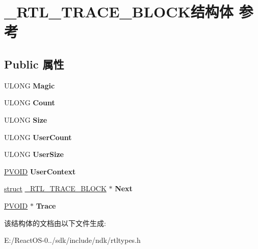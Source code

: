 \hypertarget{struct___r_t_l___t_r_a_c_e___b_l_o_c_k}{}\section{\+\_\+\+R\+T\+L\+\_\+\+T\+R\+A\+C\+E\+\_\+\+B\+L\+O\+C\+K结构体 参考}
\label{struct___r_t_l___t_r_a_c_e___b_l_o_c_k}
\subsection*{Public 属性}
\begin{DoxyCompactItemize}
\item 
\mbox{\label{struct___r_t_l___t_r_a_c_e___b_l_o_c_k_ae90b60c0f2a066729088cdd60474c30d}} 
U\+L\+O\+NG {\bfseries Magic}
\item 
\mbox{\label{struct___r_t_l___t_r_a_c_e___b_l_o_c_k_a5ec909c5648cd773cf4ccdcdfbf1ea66}} 
U\+L\+O\+NG {\bfseries Count}
\item 
\mbox{\label{struct___r_t_l___t_r_a_c_e___b_l_o_c_k_af17b0edf00ee002ff5e5aab5ca1ed260}} 
U\+L\+O\+NG {\bfseries Size}
\item 
\mbox{\label{struct___r_t_l___t_r_a_c_e___b_l_o_c_k_ad421ab182e3dbf3dcc73484c52e3e54c}} 
U\+L\+O\+NG {\bfseries User\+Count}
\item 
\mbox{\label{struct___r_t_l___t_r_a_c_e___b_l_o_c_k_a9b432a29a9535a60e6856be58e9c3a75}} 
U\+L\+O\+NG {\bfseries User\+Size}
\item 
\mbox{\label{struct___r_t_l___t_r_a_c_e___b_l_o_c_k_a0de03b5076c8ca529105cf23d7549c7f}} 
\hyperlink{interfacevoid}{P\+V\+O\+ID} {\bfseries User\+Context}
\item 
\mbox{\label{struct___r_t_l___t_r_a_c_e___b_l_o_c_k_a8b0c6d13c4581566169aca5d5577512e}} 
\hyperlink{interfacestruct}{struct} \hyperlink{struct___r_t_l___t_r_a_c_e___b_l_o_c_k}{\+\_\+\+R\+T\+L\+\_\+\+T\+R\+A\+C\+E\+\_\+\+B\+L\+O\+CK} $\ast$ {\bfseries Next}
\item 
\mbox{\label{struct___r_t_l___t_r_a_c_e___b_l_o_c_k_a1adf2aa95fbf56313495c1ec8ec1e825}} 
\hyperlink{interfacevoid}{P\+V\+O\+ID} $\ast$ {\bfseries Trace}
\end{DoxyCompactItemize}


该结构体的文档由以下文件生成\+:\begin{DoxyCompactItemize}
\item 
E\+:/\+React\+O\+S-\/0../sdk/include/ndk/rtltypes.\+h\end{DoxyCompactItemize}
